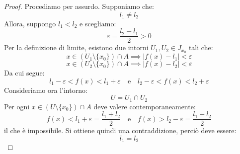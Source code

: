 \documentclass[a4paper,12pt,openright]{book}
\begin{document}
	\begin{proof}
		Procediamo per assurdo. Supponiamo che:
		\[l_1 \neq l_2\]
		Allora, suppongo $l_1 < l_2$ e scegliamo:
		\[\varepsilon = \frac{l_2 - l_1}{2} > 0\]		
		Per la definizione di limite, esistono due intorni $U_1, U_2 \in J_{x_0}$ tali che:
		\[x \in (U_1 \setminus \{x_0\}) \cap A \implies |f(x) - l_1| < \varepsilon\]
		\[x \in (U_2 \setminus \{x_0\}) \cap A \implies |f(x) - l_2| < \varepsilon\]
		Da cui segue:
		\[l_1 - \varepsilon < f(x) < l_1 + \varepsilon \quad \text{e} \quad l_2 - \varepsilon < f(x) < l_2 + \varepsilon\]
		Consideriamo ora l’intorno:
		\[U = U_1 \cap U_2\]
		Per ogni $x \in (U \setminus \{x_0\}) \cap A$ deve valere contemporaneamente:
		\[f(x) < l_1 + \varepsilon = \frac{l_1 + l_2}{2} \quad \text{e} \quad f(x) > l_2 - \varepsilon = \frac{l_1 + l_2}{2}\]
		il che è impossibile.
		Si ottiene quindi una contraddizione, perciò deve essere:
		\[l_1 = l_2\]
	\end{proof}
	
	\newpage
	
\end{document}
